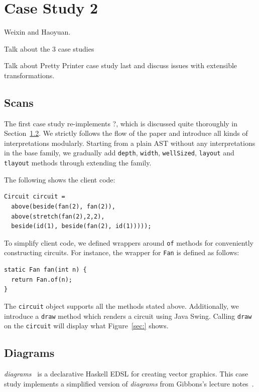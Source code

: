 \section{Case Study 2}

Weixin and Haoyuan.

Talk about the 3 case studies

Talk about Pretty Printer case study last and discuss issues with
extensible transformations.

\subsection{Scans}
The first case study re-implements ?, which is discussed quite thoroughly in
Section~\ref{}.
We strictly follows the flow of the paper and introduce all kinds of
interpretations modularly.
Starting from a plain AST without any interpretations in the base family, we gradually add
\texttt{depth}, \texttt{width}, \texttt{wellSized}, \texttt{layout} and
\texttt{tlayout} methods through extending the family.

The following shows the client code:
\begin{lstlisting}
Circuit circuit =
  above(beside(fan(2), fan(2)),
  above(stretch(fan(2),2,2),
  beside(id(1), beside(fan(2), id(1)))));
\end{lstlisting}

To simplify client code, we defined wrappers around \texttt{of} methods
for conveniently constructing circuits. For instance, the wrapper for
\texttt{Fan} is defined as follows:
\begin{lstlisting}
static Fan fan(int n) {
  return Fan.of(n);
}
\end{lstlisting}
The \texttt{circuit} object supports all the methods stated above.
Additionally, we introduce a \texttt{draw} method which renders a
circuit using Java Swing.
Calling \texttt{draw} on the \texttt{circuit} will
display what Figure~\ref{sec:} shows.

\begin{figure}
\end{figure}



\subsection{Diagrams}
\emph{diagrams}~\cite{yates2015diagrams} is a declarative Haskell EDSL for creating vector graphics.
This case study implements a simplified version of \emph{diagrams} from
Gibbons's lecture notes~\cite{gibbonsexercises}.

